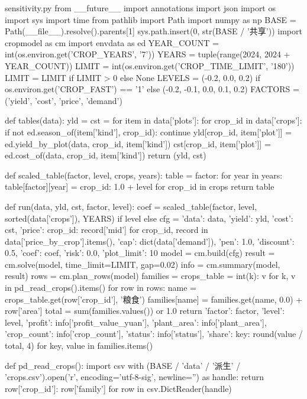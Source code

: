 \documentclass[bwprint]{gmcmthesis}
\begin{document}
\begin{appendices}

\begin{Python}{sensitivity.py}
from __future__ import annotations
import json
import os
import sys
import time
from pathlib import Path
import numpy as np
BASE = Path(__file__).resolve().parents[1]
sys.path.insert(0, str(BASE / '共享'))
import cropmodel as cm
import envdata as ed
YEAR_COUNT = int(os.environ.get('CROP_YEARS', '7'))
YEARS = tuple(range(2024, 2024 + YEAR_COUNT))
LIMIT = int(os.environ.get('CROP_TIME_LIMIT', '180'))
LIMIT = LIMIT if LIMIT > 0 else None
LEVELS = (-0.2, 0.0, 0.2) if os.environ.get('CROP_FAST') == '1' else (-0.2, -0.1, 0.0, 0.1, 0.2)
FACTORS = ('yield', 'cost', 'price', 'demand')

def tables(data):
    yld = {}
    cst = {}
    for item in data['plots']:
        for crop_id in data['crops']:
            if not ed.season_of(item['kind'], crop_id):
                continue
            yld[crop_id, item['plot']] = ed.yield_by_plot(data, crop_id, item['kind'])
            cst[crop_id, item['plot']] = ed.cost_of(data, crop_id, item['kind'])
    return (yld, cst)

def scaled_table(factor, level, crops, years):
    table = {factor: {}}
    for year in years:
        table[factor][year] = {crop_id: 1.0 + level for crop_id in crops}
    return table

def run(data, yld, cst, factor, level):
    coef = scaled_table(factor, level, sorted(data['crops']), YEARS) if level else {}
    cfg = {'data': data, 'yield': yld, 'cost': cst, 'price': {crop_id: record['mid'] for crop_id, record in data['price_by_crop'].items()}, 'cap': dict(data['demand']), 'pen': 1.0, 'discount': 0.5, 'coef': coef, 'risk': 0.0, 'plot_limit': 10}
    model = cm.build(cfg)
    result = cm.solve(model, time_limit=LIMIT, gap=0.02)
    info = cm.summary(model, result)
    rows = cm.plan_rows(model)
    families = {}
    crops_table = {int(k): v for k, v in pd_read_crops().items()}
    for row in rows:
        name = crops_table.get(row['crop_id'], '粮食')
        families[name] = families.get(name, 0.0) + row['area']
    total = sum(families.values()) or 1.0
    return {'factor': factor, 'level': level, 'profit': info['profit_value_yuan'], 'plant_area': info['plant_area'], 'crop_count': info['crop_count'], 'status': info['status'], 'share': {key: round(value / total, 4) for key, value in families.items()}}

def pd_read_crops():
    import csv
    with (BASE / 'data' / '派生' / 'crops.csv').open('r', encoding='utf-8-sig', newline='') as handle:
        return {row['crop_id']: row['family'] for row in csv.DictReader(handle)}


\end{Python}
\end{appendices}
\end{document}
